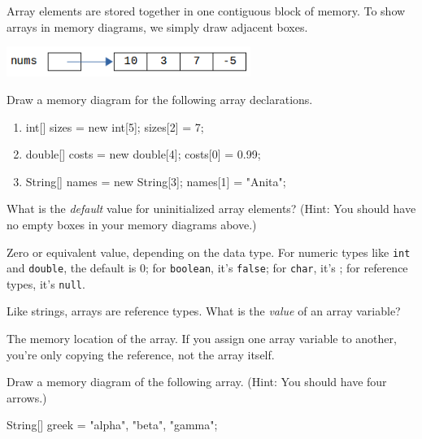 
Array elements are stored together in one contiguous block of memory. To show arrays in memory diagrams, we simply draw adjacent boxes.

\begin{center}

\vspace{1ex}
\includegraphics[width=225pt]{array-diagram1.png}
\end{center}




\Q Draw a memory diagram for the following array declarations.

\begin{enumerate}

\item
\begin{javalst}
int[] sizes = new int[5];
sizes[2] = 7;
\end{javalst}

\item
\begin{javalst}
double[] costs = new double[4];
costs[0] = 0.99;
\end{javalst}

\item
\begin{javalst}
String[] names = new String[3];
names[1] = "Anita";
\end{javalst}

\end{enumerate}


\Q What is the \emph{default} value for uninitialized array elements? (Hint: You should have no empty boxes in your memory diagrams above.)

\begin{answer}
Zero or equivalent value, depending on the data type.
For numeric types like {\tt int} and {\tt double}, the default is 0; for {\tt boolean}, it's {\tt false}; for {\tt char}, it's {\tt {}\qs}; for reference types, it's {\tt null}.
\end{answer}


\Q Like strings, arrays are reference types. What is the \emph{value} of an array variable?

\begin{answer}
The memory location of the array. If you assign one array variable to another, you're only copying the reference, not the array itself.
\end{answer}


\Q Draw a memory diagram of the following array.
(Hint: You should have four arrows.)

\begin{javalst}
String[] greek = {"alpha", "beta", "gamma"};
\end{javalst}

\begin{answer}
\end{answer}
